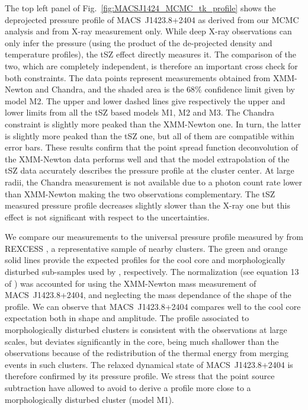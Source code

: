 \documentclass[twocolumn,traditabstract]{aa}
\begin{document}
The top left panel of Fig.~\ref{fig:MACSJ1424_MCMC_tk_profile} shows the deprojected pressure profile of \mbox{MACS~J1423.8+2404} as derived from our MCMC analysis and from X-ray measurement only. While deep X-ray observations can only infer the pressure (using the product of the de-projected density and temperature profiles), the tSZ effect directly measures it. The comparison of the two, which are completely independent, is therefore an important cross check for both constraints. The data points represent measurements obtained from XMM-Newton and Chandra, and the shaded area is the 68\% confidence limit given by model M2. The upper and lower dashed lines give respectively the upper and lower limits from all the tSZ based models M1, M2 and M3. The Chandra constraint is slightly more peaked than the XMM-Newton one. In turn, the latter is slightly more peaked than the tSZ one, but all of them are compatible within error bars. These results confirm that the point spread function deconvolution of the XMM-Newton data performs well and that the model extrapolation of the tSZ data accurately describes the pressure profile at the cluster center. At large radii, the Chandra measurement is not available due to a photon count rate lower than XMM-Newton making the two observations complementary. The tSZ measured pressure profile decreases slightly slower than the X-ray one but this effect is not significant with respect to the uncertainties. 

We compare our measurements to the universal pressure profile measured by \cite{arnaud2010} from REXCESS \citep{bohringer2007}, a representative sample of nearby clusters. The green and orange solid lines provide the expected profiles for the cool core and morphologically disturbed sub-samples used by \cite{arnaud2010}, respectively. The normalization (see equation 13 of \cite{arnaud2010}) was accounted for using the XMM-Newton mass measurement of \mbox{MACS~J1423.8+2404}, and neglecting the mass dependance of the shape of the profile. We can observe that \mbox{MACS~J1423.8+2404} compares well to the cool core expectation both in shape and amplitude. The profile associated to morphologically disturbed clusters is consistent with the observations at large scales, but deviates significantly in the core, being much shallower than the observations because of the redistribution of the thermal energy from merging events in such clusters. The relaxed dynamical state of \mbox{MACS~J1423.8+2404} is therefore confirmed by its pressure profile. We stress that the point source subtraction have allowed to avoid to derive a profile more close to a morphologically disturbed cluster (model M1).
\end{document}
